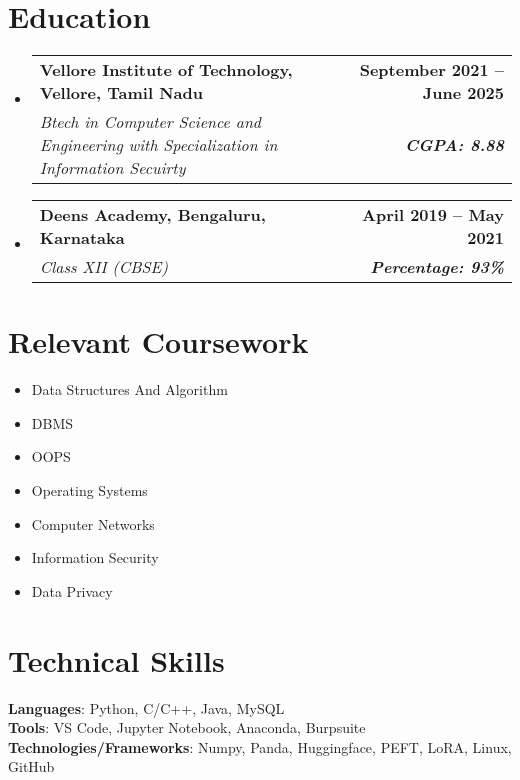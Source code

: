 \documentclass[letterpaper,11pt]{article}
\makeatletter
\newcommand{\resumeSubheading}[4]{
  \vspace{-2pt}\item
    \begin{tabular*}{1.0\textwidth}[t]{l@{\extracolsep{\fill}}r}
      \textbf{#1} & \textbf{\small #2} \\
      \textit{\small#3} & \textit{\small #4} \\
    \end{tabular*}\vspace{-7pt}
}
\newcommand{\resumeSubHeadingListStart}{\begin{itemize}[leftmargin=0.0in, label={}]}
\newcommand{\resumeSubHeadingListEnd}{\end{itemize}}
\makeatother
\begin{document}
\section{Education}
  \resumeSubHeadingListStart
    \resumeSubheading
      {Vellore Institute of Technology, Vellore, Tamil Nadu}{September 2021 -- June 2025}
      {Btech in Computer Science and Engineering with Specialization in Information Secuirty}{\textbf{\small CGPA: 8.88}}
    \resumeSubheading
      {Deens Academy, Bengaluru, Karnataka}{April 2019 -- May 2021}
      {Class XII (CBSE)}{\textbf{\small Percentage: 93\%}}
  \resumeSubHeadingListEnd

\section{Relevant Coursework}
        \begin{multicols}{4}
            \begin{itemize}[itemsep=-5pt, parsep=3pt]
                \item\small Data Structures And Algorithm
                \item\small DBMS
                \item\small OOPS
                \item Operating Systems
                \item Computer Networks
                \item Information Security
                \item Data Privacy
            \end{itemize}
        \end{multicols}
        \vspace*{2.0\multicolsep}

%
\section{Technical Skills}
 \begin{itemize}[leftmargin=0.15in, label={}]
    \small{\item{
     \textbf{Languages}{: Python, C/C++, Java, MySQL} \\
     \textbf{Tools}{: VS Code, Jupyter Notebook, Anaconda, Burpsuite} \\
     \textbf{Technologies/Frameworks}{: Numpy, Panda, Huggingface, PEFT, LoRA, Linux, GitHub} \\
    }}
 \end{itemize}
 \vspace{-16pt}
 
\end{document}
